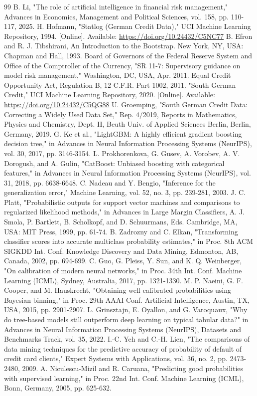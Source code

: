 \documentclass[conference,a4paper]{IEEEtran}
\begin{document}
\begin{thebibliography}{99}
 B. Li, "The role of artificial intelligence in financial risk management," Advances in Economics, Management and Political Sciences, vol. 158, pp. 110-117, 2025.
 H. Hofmann, "Statlog (German Credit Data)," UCI Machine Learning Repository, 1994. [Online]. Available: \url{https://doi.org/10.24432/C5NC77}
 B. Efron and R. J. Tibshirani, An Introduction to the Bootstrap. New York, NY, USA: Chapman and Hall, 1993.
 Board of Governors of the Federal Reserve System and Office of the Comptroller of the Currency, "SR 11-7: Supervisory guidance on model risk management," Washington, DC, USA, Apr. 2011.
 Equal Credit Opportunity Act, Regulation B, 12 C.F.R. Part 1002, 2011.
 "South German Credit," UCI Machine Learning Repository, 2020. [Online]. Available: \url{https://doi.org/10.24432/C5QG88}
 U. Groemping, "South German Credit Data: Correcting a Widely Used Data Set," Rep. 4/2019, Reports in Mathematics, Physics and Chemistry, Dept. II, Beuth Univ. of Applied Sciences Berlin, Berlin, Germany, 2019.
 G. Ke et al., "LightGBM: A highly efficient gradient boosting decision tree," in Advances in Neural Information Processing Systems (NeurIPS), vol. 30, 2017, pp. 3146-3154.
 L. Prokhorenkova, G. Gusev, A. Vorobev, A. V. Dorogush, and A. Gulin, "CatBoost: Unbiased boosting with categorical features," in Advances in Neural Information Processing Systems (NeurIPS), vol. 31, 2018, pp. 6638-6648.
 C. Nadeau and Y. Bengio, "Inference for the generalization error," Machine Learning, vol. 52, no. 3, pp. 239-281, 2003.
 J. C. Platt, "Probabilistic outputs for support vector machines and comparisons to regularized likelihood methods," in Advances in Large Margin Classifiers, A. J. Smola, P. Bartlett, B. Scholkopf, and D. Schuurmans, Eds. Cambridge, MA, USA: MIT Press, 1999, pp. 61-74.
 B. Zadrozny and C. Elkan, "Transforming classifier scores into accurate multiclass probability estimates," in Proc. 8th ACM SIGKDD Int. Conf. Knowledge Discovery and Data Mining, Edmonton, AB, Canada, 2002, pp. 694-699.
 C. Guo, G. Pleiss, Y. Sun, and K. Q. Weinberger, "On calibration of modern neural networks," in Proc. 34th Int. Conf. Machine Learning (ICML), Sydney, Australia, 2017, pp. 1321-1330.
 M. P. Naeini, G. F. Cooper, and M. Hauskrecht, "Obtaining well calibrated probabilities using Bayesian binning," in Proc. 29th AAAI Conf. Artificial Intelligence, Austin, TX, USA, 2015, pp. 2901-2907.
 L. Grinsztajn, E. Oyallon, and G. Varoquaux, "Why do tree-based models still outperform deep learning on typical tabular data?" in Advances in Neural Information Processing Systems (NeurIPS), Datasets and Benchmarks Track, vol. 35, 2022.
 I.-C. Yeh and C.-H. Lien, "The comparisons of data mining techniques for the predictive accuracy of probability of default of credit card clients," Expert Systems with Applications, vol. 36, no. 2, pp. 2473-2480, 2009.
 A. Niculescu-Mizil and R. Caruana, "Predicting good probabilities with supervised learning," in Proc. 22nd Int. Conf. Machine Learning (ICML), Bonn, Germany, 2005, pp. 625-632.
\end{thebibliography}
\end{document}
